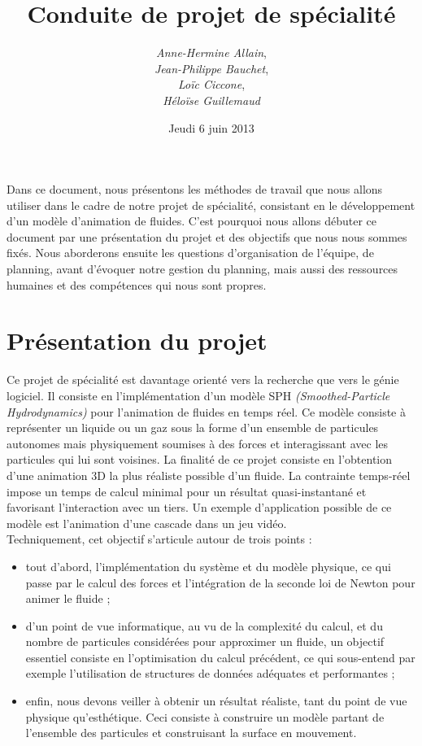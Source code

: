 \documentclass[12pt]{article}
\title{Conduite de projet de spécialité}
\author{{\em Anne-Hermine Allain}, \\ 
{\em Jean-Philippe Bauchet}, \\ 
{\em Loïc Ciccone}, \\ 
{\em Héloïse Guillemaud}}
\date{Jeudi 6 juin 2013}
\begin{document}
\maketitle

Dans ce document, nous présentons les méthodes de travail que nous allons utiliser dans le cadre de notre projet de spécialité, consistant en le développement d'un modèle d'animation de fluides. C'est pourquoi nous allons débuter ce document par une présentation du projet et des objectifs que nous nous sommes fixés. Nous aborderons ensuite les questions d'organisation de l'équipe, de planning, avant d'évoquer notre gestion du planning, mais aussi des ressources humaines et des compétences qui nous sont propres.

\section{Présentation du projet}

Ce projet de spécialité est davantage orienté vers la recherche que vers le génie logiciel. Il consiste en l'implémentation d'un modèle SPH {\em (Smoothed-Particle Hydrodynamics)} pour l'animation de fluides en temps réel. Ce modèle consiste à représenter un liquide ou un gaz sous la forme d'un ensemble de particules autonomes mais physiquement soumises à des forces et interagissant avec les particules qui lui sont voisines. La finalité de ce projet consiste en l'obtention d'une animation 3D la plus réaliste possible d'un fluide. La contrainte temps-réel impose un temps de calcul minimal pour un résultat quasi-instantané et favorisant l'interaction avec un tiers. Un exemple d'application possible de ce modèle est l'animation d'une cascade dans un jeu vidéo. \\

Techniquement, cet objectif s'articule autour de trois points : \\

\begin{itemize}
\item tout d'abord, l'implémentation du système et du modèle physique, ce qui passe par le calcul des forces et l'intégration de la seconde loi de Newton pour animer le fluide ;
\item d'un point de vue informatique, au vu de la complexité du calcul, et du nombre de particules considérées pour approximer un fluide, un objectif essentiel consiste en l'optimisation du calcul précédent, ce qui sous-entend par exemple l'utilisation de structures de données adéquates et performantes ;
\item enfin, nous devons veiller à obtenir un résultat réaliste, tant du point de vue physique qu'esthétique. Ceci consiste à construire un modèle partant de l'ensemble des particules et construisant la surface en mouvement. \\
\end{itemize}
\end{document}
